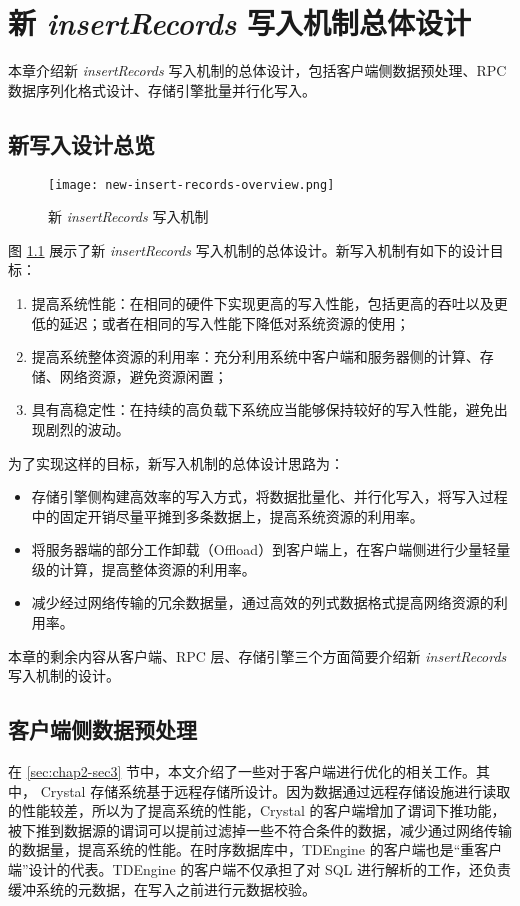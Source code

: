 
\chapter{新 \emph{insertRecords} 写入机制总体设计}
本章介绍新 \emph{insertRecords} 写入机制的总体设计，包括客户端侧数据预处理、RPC 数据序列化格式设计、存储引擎批量并行化写入。

\section{新写入设计总览}
\begin{figure}
  \centering
  \texttt{[image: new-insert-records-overview.png]}
  \caption{新 \emph{insertRecords} 写入机制}
  \label{fig:new-insert-records-overview}
\end{figure}

图 \ref{fig:new-insert-records-overview} 展示了新 \emph{insertRecords} 写入机制的总体设计。新写入机制有如下的设计目标：
\begin{enumerate}
  \item 提高系统性能：在相同的硬件下实现更高的写入性能，包括更高的吞吐以及更低的延迟；或者在相同的写入性能下降低对系统资源的使用；
  \item 提高系统整体资源的利用率：充分利用系统中客户端和服务器侧的计算、存储、网络资源，避免资源闲置；
  \item 具有高稳定性：在持续的高负载下系统应当能够保持较好的写入性能，避免出现剧烈的波动。
\end{enumerate}
为了实现这样的目标，新写入机制的总体设计思路为：
\begin{itemize}
  \item 存储引擎侧构建高效率的写入方式，将数据批量化、并行化写入，将写入过程中的固定开销尽量平摊到多条数据上，提高系统资源的利用率。
  \item 将服务器端的部分工作卸载（Offload）到客户端上，在客户端侧进行少量轻量级的计算，提高整体资源的利用率。
  \item 减少经过网络传输的冗余数据量，通过高效的列式数据格式提高网络资源的利用率。
\end{itemize}
本章的剩余内容从客户端、RPC 层、存储引擎三个方面简要介绍新 \emph{insertRecords} 写入机制的设计。

\section{客户端侧数据预处理}
在 \ref{sec:chap2-sec3} 节中，本文介绍了一些对于客户端进行优化的相关工作。其中， Crystal 存储系统基于远程存储所设计\cite{durner2021crystal}。因为数据通过远程存储设施进行读取的性能较差，所以为了提高系统的性能，Crystal 的客户端增加了谓词下推功能，被下推到数据源的谓词可以提前过滤掉一些不符合条件的数据，减少通过网络传输的数据量，提高系统的性能。在时序数据库中，TDEngine 的客户端也是“重客户端”设计的代表。TDEngine 的客户端不仅承担了对 SQL 进行解析的工作，还负责缓冲系统的元数据，在写入之前进行元数据校验。

